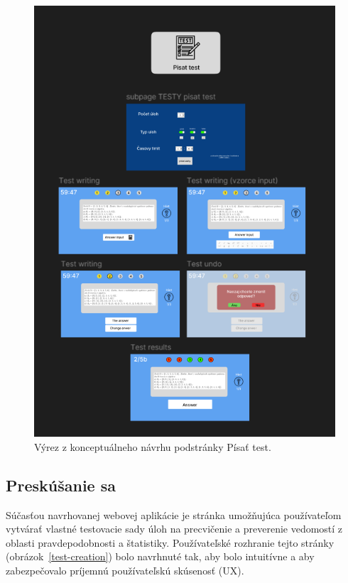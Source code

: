 \begin{figure}[H]
  \centering
  \includegraphics[width=16cm]{img/figma_screen.png}
  \caption{Výrez z konceptuálneho návrhu podstránky Písať test.}
  \label{figmavizual}
\end{figure} 

\subsection{Preskúšanie sa}

Súčasťou navrhovanej webovej aplikácie je stránka umožňujúca používateľom vytvárať vlastné testovacie sady úloh na precvičenie a preverenie vedomostí z oblasti pravdepodobnosti a štatistiky.
 Používateľské rozhranie tejto stránky (obrázok~\ref{test-creation}) bolo navrhnuté tak, aby bolo intuitívne a aby zabezpečovalo príjemnú používateľskú skúsenosť (UX).

